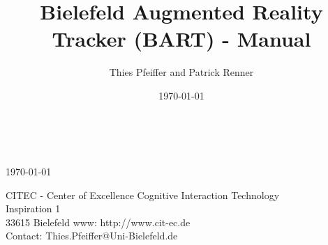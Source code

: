 \begin{titlepage}

\title{Bielefeld Augmented Reality Tracker (BART) - Manual}
\author{Thies Pfeiffer and Patrick Renner}
\date{\today}

\begin{center}
\thispagestyle{empty}

{\fontsize{24.88}{28}
 \thetitle\\[0.5cm]
}
\fontsize{12}{12}
\vspace{1cm}


\vspace{1.5cm} \today

\vspace{1cm}

\theauthor

\vspace{3cm}
CITEC - Center of Excellence Cognitive Interaction Technology\\
Inspiration 1\\
33615 Bielefeld
\vspace{.2cm}
www: http://www.cit-ec.de\\
Contact: Thies.Pfeiffer@Uni-Bielefeld.de
\end{center}
\end{titlepage}
